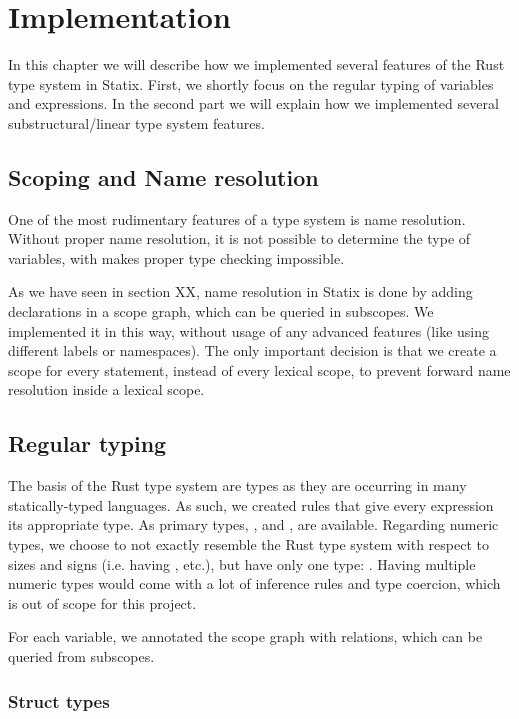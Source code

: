 \section{Implementation} \label{s:implementation}

In this chapter we will describe how we implemented several features of the Rust type system in Statix. First, we shortly focus on the regular typing of variables and expressions. In the second part we will explain how we implemented several substructural/linear type system features.

\subsection{Scoping and Name resolution}

One of the most rudimentary features of a type system is name resolution. Without proper name resolution, it is not possible to determine the type of variables, with makes proper type checking impossible.

As we have seen in section XX, name resolution in Statix is done by adding declarations in a scope graph, which can be queried in subscopes. We implemented it in this way, without usage of any advanced features (like using different labels or namespaces). The only important decision is that we create a scope for every statement, instead of every lexical scope, to prevent forward name resolution inside a lexical scope.

\subsection{Regular typing}

The basis of the Rust type system are types as they are occurring in many statically-typed languages. As such, we created rules  that give every expression its appropriate type. As primary types, ,  and , are available. Regarding numeric types, we choose to not exactly resemble the Rust type system with respect to sizes and signs (i.e. having ,  etc.), but have only one type: . Having multiple numeric types would come with a lot of inference rules and type coercion, which is out of scope for this project.

For each variable, we annotated the scope graph with  relations, which can be queried from subscopes.

\subsubsection{Struct types}

